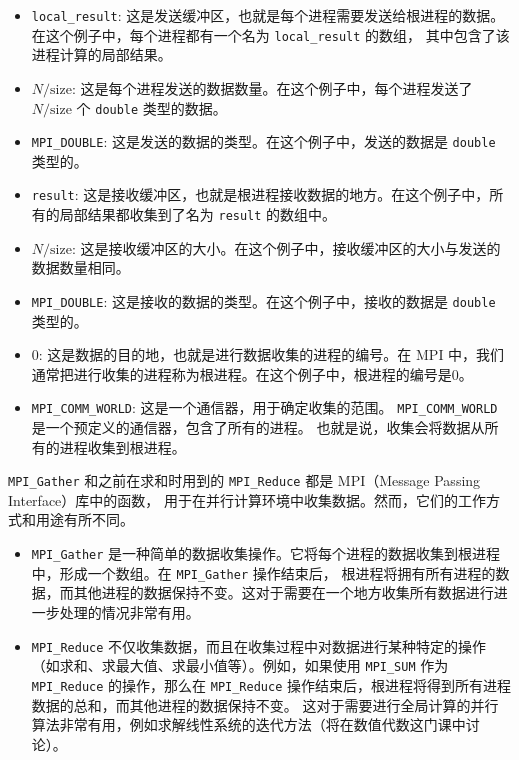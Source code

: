 \documentclass{ctexart}
\begin{document}
\begin{itemize}  
    \item \texttt{local\_result}: 这是发送缓冲区，也就是每个进程需要发送给根进程的数据。在这个例子中，每个进程都有一个名为 \texttt{local\_result} 的数组，
    其中包含了该进程计算的局部结果。  
    \item $N / \text{{size}}$: 这是每个进程发送的数据数量。在这个例子中，每个进程发送了 $N / \text{{size}}$ 个 \texttt{double} 类型的数据。  
    \item \texttt{MPI\_DOUBLE}: 这是发送的数据的类型。在这个例子中，发送的数据是 \texttt{double} 类型的。  
    \item \texttt{result}: 这是接收缓冲区，也就是根进程接收数据的地方。在这个例子中，所有的局部结果都收集到了名为 \texttt{result} 的数组中。  
    \item $N / \text{{size}}$: 这是接收缓冲区的大小。在这个例子中，接收缓冲区的大小与发送的数据数量相同。  
    \item \texttt{MPI\_DOUBLE}: 这是接收的数据的类型。在这个例子中，接收的数据是 \texttt{double} 类型的。  
    \item $0$: 这是数据的目的地，也就是进行数据收集的进程的编号。在 MPI 中，我们通常把进行收集的进程称为根进程。在这个例子中，根进程的编号是0。  
    \item \texttt{MPI\_COMM\_WORLD}: 这是一个通信器，用于确定收集的范围。 \texttt{MPI\_COMM\_WORLD} 是一个预定义的通信器，包含了所有的进程。
    也就是说，收集会将数据从所有的进程收集到根进程。  
\end{itemize}  
  
\texttt{MPI\_Gather} 和之前在求和时用到的 \texttt{MPI\_Reduce} 都是 MPI（Message Passing Interface）库中的函数，
用于在并行计算环境中收集数据。然而，它们的工作方式和用途有所不同。  
  
\begin{itemize}  
    \item \texttt{MPI\_Gather} 是一种简单的数据收集操作。它将每个进程的数据收集到根进程中，形成一个数组。在 \texttt{MPI\_Gather} 操作结束后，
    根进程将拥有所有进程的数据，而其他进程的数据保持不变。这对于需要在一个地方收集所有数据进行进一步处理的情况非常有用。  
      
    \item \texttt{MPI\_Reduce} 不仅收集数据，而且在收集过程中对数据进行某种特定的操作（如求和、求最大值、求最小值等）。例如，如果使用 \texttt{MPI\_SUM} 
    作为 \texttt{MPI\_Reduce} 的操作，那么在 \texttt{MPI\_Reduce} 操作结束后，根进程将得到所有进程数据的总和，而其他进程的数据保持不变。
    这对于需要进行全局计算的并行算法非常有用，例如求解线性系统的迭代方法（将在数值代数这门课中讨论）。  
\end{itemize}  
\end{document}
